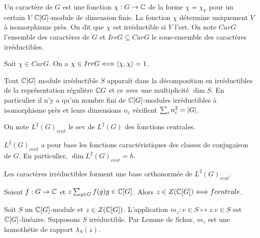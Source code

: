 \documentclass{cours}
\begin{document}
\begin{definition}
    Un caractère de $G$ est une fonction $\chi : G \rightarrow \mathbb{C}$ de la forme $\chi = \chi_V$ pour un certain $V$ $\mathbb{C}[G]$-module de dimension finie. La fonction $\chi$ détermine uniquement $V$ à isomorphisme près. On dit que $\chi$ est irréductible si $V$ l'est. On note $Car G$ l'ensemble des caractères de $G$ et $Irr G \subseteq Car G$ le sous-ensemble des caractères irréductibles.
\end{definition}

\begin{corollary}
    Soit $\chi \in Car G$. On a $\chi \in Irr G \Longleftrightarrow \left\langle \chi, \chi \right\rangle = 1$.
\end{corollary}

\begin{corollary}
    Tout $\mathbb{C}[G]$ module irréductible $S$ apparaît dans la décomposition en irréductibles de la représentation régulière $\mathbb{C} G$ et ce avec une multiplicité $\dim S$. En particulier il n'y a qu'un nombre fini de $\mathbb{C}[G]$-modules irréductibles à isomorphisme près et leurs dimensions $n_{i}$ vérifient $\sum_{i}n_{i}^{2} = \left|G\right|$.
\end{corollary}

\begin{definition}
    On note $L^{2}(G)_{cent}$ le sev de $L^{2}(G)$ des fonctions centrales.
\end{definition}

\begin{lemma}
    $L^{2}(G)_{cent}$ a pour base les fonctions caractéristiques des classes de conjugaison de $G$. En particulier, $\dim L^{2}(G)_{cent} = h$.
\end{lemma}

\begin{theorem}
    Les caractères irréductibles forment une base orthonormée de $L^{2}(G)_{cent}$.
\end{theorem}

\begin{lemma}
    Soient $f : G \rightarrow \mathbb{C}$ et $z \sum_{g \in G}f(g)g \in \mathbb{C}[G]$. Alors $z \in Z(\mathbb{C}[G]) \Longleftrightarrow f centrale$.
\end{lemma}

\begin{definition}
    Soit $S$ un $\mathbb{C}[G]$-module et $z \in Z(\mathbb{C}[G])$. L'application $m_{z} : v \in S \mapsto z.v \in S$ est $\mathbb{C}[G]$-linéaire. Supposons $S$ irréductible. Par Lemme de Schur, $m_{z}$ est une homothétie de rapport $\lambda_{S}(z)$.
\end{definition}
\end{document}
